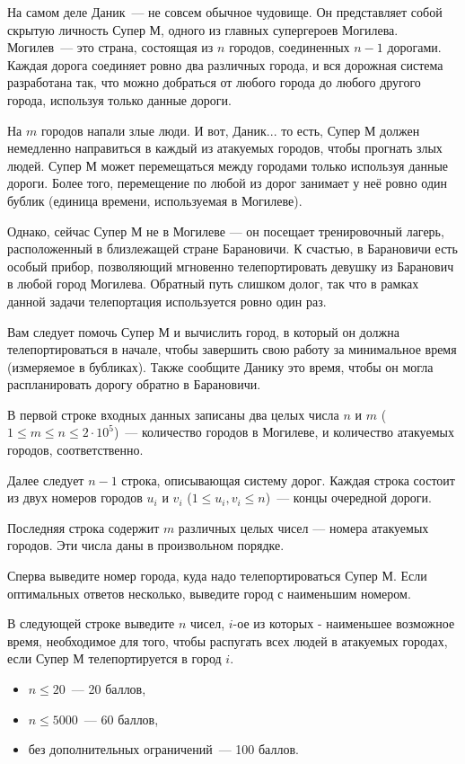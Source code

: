 
\Legend

На самом деле Даник~--- не совсем обычное чудовище. Он представляет собой скрытую личность Супер М, одного из главных супергероев Могилева. Могилев~--- это страна, состоящая из $n$ городов, соединенных $n - 1$ дорогами. Каждая дорога соединяет ровно два различных города, и вся дорожная система разработана так, что можно добраться от любого города до любого другого города, используя только данные дороги.

На $m$ городов напали злые люди. И вот, Даник... то есть, Супер М должен немедленно направиться в каждый из атакуемых городов, чтобы прогнать злых людей. Супер М может перемещаться между городами только используя данные дороги. Более того, перемещение по любой из дорог занимает у неё ровно один бублик (единица времени, используемая в Могилеве).

Однако, сейчас Супер М не в Могилеве — он посещает тренировочный лагерь, расположенный в близлежащей стране Барановичи. К счастью, в Барановичи есть особый прибор, позволяющий мгновенно телепортировать девушку из Баранович в любой город Могилева. Обратный путь слишком долог, так что в рамках данной задачи телепортация используется ровно один раз.

Вам следует помочь Супер М и вычислить город, в который он должна телепортироваться в начале, чтобы завершить свою работу за минимальное время (измеряемое в бубликах). Также сообщите Данику это время, чтобы он могла распланировать дорогу обратно в Барановичи.

\Input

В первой строке входных данных записаны два целых числа $n$ и $m$ ($1 \le m \le n \le 2 \cdot 10^5$)~--- количество городов в Могилеве, и количество атакуемых городов, соответственно.

Далее следует $n - 1$ строка, описывающая систему дорог. Каждая строка состоит из двух номеров городов $u_i$ и $v_i$ ($1 \le u_i, v_i \le n$)~--- концы очередной дороги.

Последняя строка содержит $m$ различных целых чисел — номера атакуемых городов. Эти числа даны в произвольном порядке.

\Output

Сперва выведите номер города, куда надо телепортироваться Супер М. Если оптимальных ответов несколько, выведите город с наименьшим номером.

В следующей строке выведите $n$ чисел, $i$-ое из которых - наименьшее возможное время, необходимое для того, чтобы распугать всех людей в атакуемых городах, если Супер М телепортируется в город $i$.

\Samples
\BeginTests
\EndTests

\Scoring
\begin{itemize}
	\item $n \le 20$~--- 20 баллов,
	\item $n \le 5000$~--- 60 баллов,
	\item без дополнительных ограничений~--- 100 баллов.
\end{itemize}

\EndProblem
